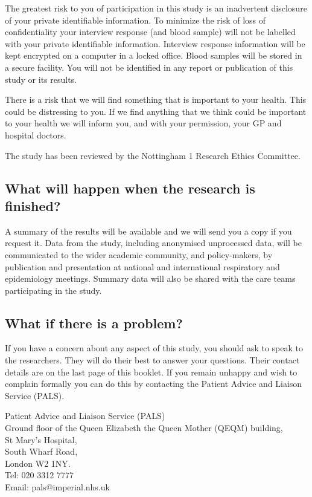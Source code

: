 \documentclass[a4paper,10pt]{article}
\begin{document}
The greatest risk to you of participation in this study is an inadvertent disclosure of your private identifiable information. To minimize the risk of loss of confidentiality your interview response (and blood sample) will not be labelled with your private identifiable information. Interview response information will be kept encrypted on a computer in a locked office. Blood samples will be stored in a secure facility. You will not be identified in any report or publication of this study or its results.

There is a risk that we will find something that is important to your health. This could be distressing to you. If we find anything that we think could be important to your health we will inform you, and with your permission, your GP and hospital doctors. 

The study has been reviewed by the Nottingham 1 Research Ethics Committee.

\subsection*{What will happen when the research is finished?}

A summary of the results will be available and we will send you a copy if you request it. Data from the study, including anonymised unprocessed data, will be communicated to the wider academic community, and policy-makers, by publication and presentation at national and international respiratory and epidemiology meetings. Summary data will also be shared with the care teams participating in the study. 

\subsection*{What if there is a problem?}

If you have a concern about any aspect of this study, you should ask to speak to the researchers. They will do their best to answer your questions. Their contact details are on the last page of this booklet. If you remain unhappy and wish to complain formally you can do this by contacting the Patient Advice and Liaison Service (PALS). \\

\newpage

\begin{flushleft}

Patient Advice and Liaison Service (PALS) \\    
Ground floor of the Queen Elizabeth the Queen Mother (QEQM) building, \\
St Mary’s Hospital, \\
South Wharf Road,\\
London W2 1NY.\\
Tel: 020 3312 7777\\
Email: pals@imperial.nhs.uk\\

\end{flushleft}
\end{document}
